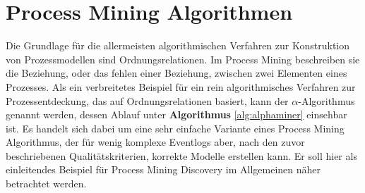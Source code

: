 

\section{Process Mining Algorithmen}
Die Grundlage für die allermeisten algorithmischen Verfahren zur Konstruktion von Prozessmodellen sind Ordnungsrelationen. Im Process Mining beschreiben sie die Beziehung, oder das fehlen einer Beziehung, zwischen zwei Elementen eines Prozesses. 
Als ein verbreitetes  Beispiel für ein rein algorithmisches Verfahren zur Prozessentdeckung, das auf Ordnungsrelationen basiert, kann der $\alpha$-Algorithmus genannt werden, dessen Ablauf unter \textbf{ Algorithmus }\ref{alg:alphaminer} einsehbar ist.
Es handelt sich dabei um eine sehr einfache Variante eines Process Mining Algorithmus, der für wenig komplexe Eventlogs aber, nach den zuvor beschriebenen Qualitätskriterien, korrekte Modelle erstellen kann. Er soll hier als einleitendes Beispiel für Process Mining Discovery im Allgemeinen näher betrachtet werden. \newline

